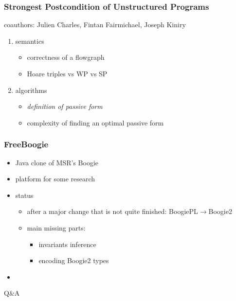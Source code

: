 \documentclass{beamer}
\begin{document}
\begin{frame}
  \frametitle{Strongest Postcondition of Unstructured Programs}
  coauthors: Julien Charles, Fintan Fairmichael, Joseph Kiniry
  \bigskip
  \begin{enumerate}
  \item semantics
    \begin{itemize}
    \item correctness of a flowgraph
    \item Hoare triples vs WP vs SP
    \end{itemize}
  \item algorithms
    \begin{itemize}
    \item \emph{definition of passive form}
    \item complexity of finding an optimal passive form
    \end{itemize}
  \end{enumerate}
\end{frame}

\begin{frame}
  \frametitle{FreeBoogie}
  \begin{itemize}
  \item Java clone of MSR's Boogie
  \item platform for some research
  \item status
    \begin{itemize}
    \item after a major change that is not quite finished:
      BoogiePL$\to$Boogie2
    \item main missing parts:
      \begin{itemize}
      \item invariants inference
      \item encoding Boogie2 types
      \end{itemize}
    \end{itemize}
  \item 
  \end{itemize}
\end{frame}
\begin{frame}
\centerline{\Huge Q\&A}
\end{frame}
\end{document}
